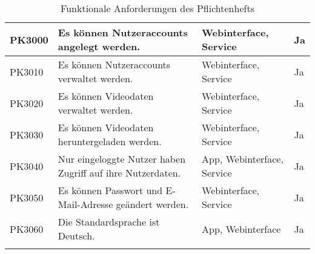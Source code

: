 \begin{longtable}{p{} | p{} | p{} | p{}}
  \hline 
  PK3000 & Es können Nutzeraccounts angelegt werden. & Webinterface, Service & Ja
   \\
  \hline 
  PK3010 & Es können Nutzeraccounts verwaltet werden. & Webinterface, Service & Ja
   \\
  \hline 
  PK3020 & Es können Videodaten verwaltet werden. & Webinterface, Service & Ja
   \\
  \hline 
  PK3030 & Es können Videodaten heruntergeladen werden. & Webinterface, Service & Ja
   \\
  \hline 
  PK3040 & Nur eingeloggte Nutzer haben Zugriff auf ihre Nutzerdaten. & App, Webinterface, Service & Ja
   \\
  \hline 
  PK3050 & Es können Passwort und E-Mail-Adresse geändert werden. & Webinterface, Service & Ja
   \\
  \hline 
  PK3060 & Die Standardsprache ist Deutsch. & App, Webinterface & Ja
  \\
  \hline
  \caption{Funktionale Anforderungen des Pflichtenhefts}
 \end{longtable}
